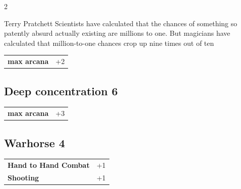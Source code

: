 \begin{multicols}{2}
\begin{tcolorbox}
\begin{pquote}{Terry Pratchett}
Scientists have calculated that the chances of something so patently absurd actually existing are millions to one. But magicians have calculated that million-to-one chances crop up nine times out of ten
\end{pquote}

\vspace{3mm}

\begin{tabular}{@{}ll@{}}
    \textbf{max arcana} & +2\\
\end{tabular}


\end{tcolorbox}

\begin{tcolorbox}
    \subsection*{Deep concentration \hfill \small{6 }}
    \tcblower




\begin{tabular}{@{}ll@{}}
    \textbf{max arcana} & +3\\
\end{tabular}


\end{tcolorbox}

\begin{tcolorbox}
    \subsection*{Warhorse \hfill \small{4 }}
    \tcblower




\begin{tabular}{@{}ll@{}}
    \textbf{Hand to Hand Combat} & +1\\
    \textbf{Shooting} & +1\\
\end{tabular}



\end{tcolorbox}
\end{multicols}
